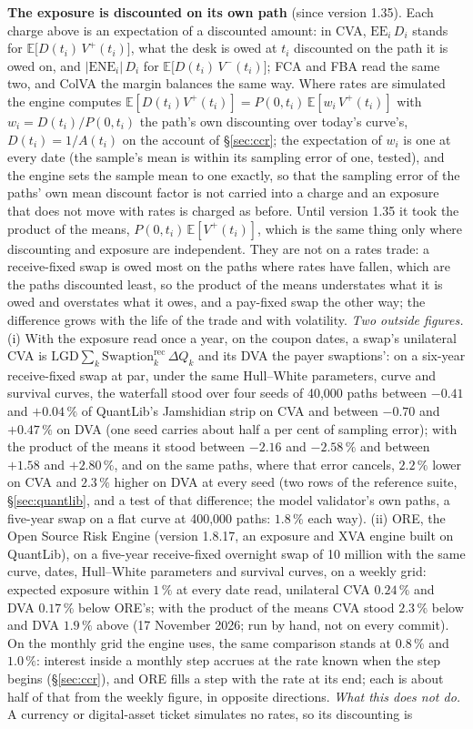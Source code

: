 \documentclass[11pt,a4paper]{article}
\newcommand{\E}{\mathbb{E}}
\begin{document}
\textbf{The exposure is discounted on its own path} (since version 1.35). Each charge above is an expectation of a discounted amount: in CVA, $\mathrm{EE}_i\,D_i$ stands for $\E\big[D(t_i)\,V^+(t_i)\big]$, what the desk is owed at $t_i$ discounted on the path it is owed on, and $|\mathrm{ENE}_i|\,D_i$ for $\E\big[D(t_i)\,V^-(t_i)\big]$; FCA and FBA read the same two, and ColVA the margin balances the same way. Where rates are simulated the engine computes $\E[D(t_i)V^+(t_i)]=P(0,t_i)\,\E[w_i\,V^+(t_i)]$ with $w_i=D(t_i)/P(0,t_i)$ the path's own discounting over today's curve's, $D(t_i)=1/A(t_i)$ on the account of \S\ref{sec:ccr}; the expectation of $w_i$ is one at every date (the sample's mean is within its sampling error of one, tested), and the engine sets the sample mean to one exactly, so that the sampling error of the paths' own mean discount factor is not carried into a charge and an exposure that does not move with rates is charged as before. Until version 1.35 it took the product of the means, $P(0,t_i)\,\E[V^+(t_i)]$, which is the same thing only where discounting and exposure are independent. They are not on a rates trade: a receive-fixed swap is owed most on the paths where rates have fallen, which are the paths discounted least, so the product of the means understates what it is owed and overstates what it owes, and a pay-fixed swap the other way; the difference grows with the life of the trade and with volatility. \emph{Two outside figures.} (i) With the exposure read once a year, on the coupon dates, a swap's unilateral CVA is $\mathrm{LGD}\sum_k \mathrm{Swaption}^{\mathrm{rec}}_k\,\Delta Q_k$ and its DVA the payer swaptions': on a six-year receive-fixed swap at par, under the same Hull--White parameters, curve and survival curves, the waterfall stood over four seeds of 40{,}000 paths between $-0.41$ and $+0.04\,\%$ of QuantLib's Jamshidian strip on CVA and between $-0.70$ and $+0.47\,\%$ on DVA (one seed carries about half a per cent of sampling error); with the product of the means it stood between $-2.16$ and $-2.58\,\%$ and between $+1.58$ and $+2.80\,\%$, and on the same paths, where that error cancels, $2.2\,\%$ lower on CVA and $2.3\,\%$ higher on DVA at every seed (two rows of the reference suite, \S\ref{sec:quantlib}, and a test of that difference; the model validator's own paths, a five-year swap on a flat curve at 400{,}000 paths: $1.8\,\%$ each way). (ii) ORE, the Open Source Risk Engine (version 1.8.17, an exposure and XVA engine built on QuantLib), on a five-year receive-fixed overnight swap of 10 million with the same curve, dates, Hull--White parameters and survival curves, on a weekly grid: expected exposure within $1\,\%$ at every date read, unilateral CVA $0.24\,\%$ and DVA $0.17\,\%$ below ORE's; with the product of the means CVA stood $2.3\,\%$ below and DVA $1.9\,\%$ above (17 November 2026; run by hand, not on every commit). On the monthly grid the engine uses, the same comparison stands at $0.8\,\%$ and $1.0\,\%$: interest inside a monthly step accrues at the rate known when the step begins (\S\ref{sec:ccr}), and ORE fills a step with the rate at its end; each is about half of that from the weekly figure, in opposite directions. \emph{What this does not do.} A currency or digital-asset ticket simulates no rates, so its discounting is 
\end{document}
